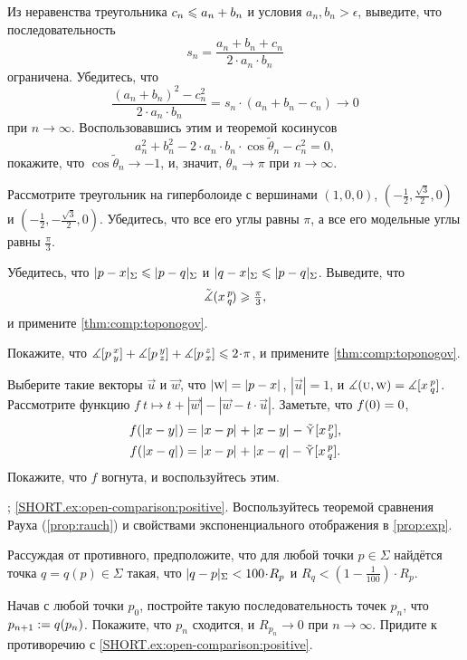 \begin{multicols}{2}
\setcounter{eqtn}{0}

Из неравенства треугольника $c_n\z\le a_n\z+b_n$ и условия $a_n,b_n>\epsilon$, выведите, что последовательность 
\[
s_n=\frac{a_n+b_n+c_n}{2\cdot a_n\cdot b_n}
\]
ограничена.
Убедитесь, что
\[
\frac{(a_n+b_n)^2-c_n^2}{2\cdot a_n\cdot b_n}=s_n\cdot (a_n+b_n-c_n)\to 0
\]
при $n\to\infty$.
Воспользовавшись этим и теоремой косинусов
\[
a_n^2+b_n^2-2\cdot a_n\cdot b_n\cdot\cos\tilde\theta_n -c_n^2=0,
\]
покажите, что $\cos\tilde\theta_n\to -1$, и, значит, $\theta_n\to \pi$ при $n\to\infty$.

Рассмотрите треугольник на гиперболоиде с вершинами $(1,0,0)$, $(-\tfrac{1}2, \tfrac{\sqrt{3}}2, 0)$ и $(-\tfrac{1}2, -\tfrac{\sqrt{3}}2, 0)$.
Убедитесь, что все его углы равны $\pi$, а все его модельные углы равны $\tfrac{\pi}3$.

Убедитесь, что $\dist{p}{x}\Sigma\le \dist{p}{q}\Sigma$ и $\dist{q}{x}\Sigma\le \dist{p}{q}\Sigma$.
Выведите, что
\[\tilde\measuredangle(x\,{}^{p}_{q}\hspace{-0.2ex})\geqslant \tfrac\pi3,\]
и примените \ref{thm:comp:toponogov}.

Покажите, что 
$\measuredangle\hinge pxy+\measuredangle\hinge pyz+\measuredangle\hinge pzx\z\le2\cdot \pi$,
и примените \ref{thm:comp:toponogov}.

Выберите такие векторы $\vec u$ и $\vec w$, что $|\vec w|\z=\dist{p}{x}{}$, $|\vec u|=1$, и $\measuredangle(\text{\sc{u}},\text{\sc{w}})=\measuredangle[x\,{}^{p}_{q}]$.
Рассмотрите функцию
$f\:t\mapsto t+|\vec w|-|\vec w-t\cdot \vec u|$.
Заметьте, что $f(0)\z=0$,
\begin{align*}
f(\dist{x}{y}{})&=\dist{x}{p}{}+\dist{x}{y}{}-\side\hinge xpy,
\\
f(\dist{x}{q}{})&=\dist{x}{p}{}+\dist{x}{q}{}-\side\hinge xpq.
\end{align*}
Покажите, что $f$ вогнута, и воспользуйтесь этим.

\parbf{\ref{ex:open-comparison}}; \ref{SHORT.ex:open-comparison:positive}.
Воспользуйтесь теоремой сравнения Рауха (\ref{prop:rauch}) и свойствами экспоненциального отображения в \ref{prop:exp}.

Рассуждая от противного,
предположите, что для любой точки $p\in\Sigma$ найдётся точка $q=q(p)\in \Sigma$ такая, что 
$\dist{q}{p}\Sigma< 100\cdot R_p$
и
$R_q<(1-\tfrac1{100})\cdot R_p$.

Начав с любой точки $p_0$, постройте такую последовательность точек $p_n$, что $p_{n+1}\z\df q(p_n)$.
Покажите, что $p_n$ сходится, и $R_{p_n}\to 0$ при $n\to\infty$.
Придите к противоречию с \ref{SHORT.ex:open-comparison:positive}.


\end{multicols}
